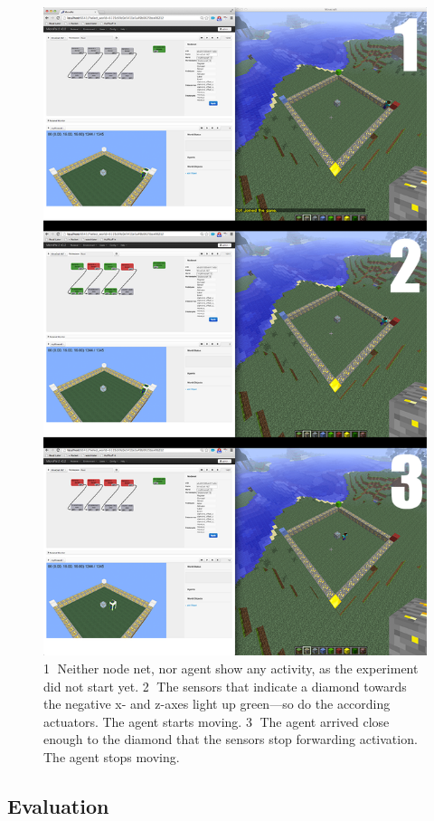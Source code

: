 \begin{figure}[h]
  \centering
    \includegraphics[width=12cm]{graphics/diamond_screens}
  \caption[Screenshots of the experiment]{\textcircled{1} Neither node net, nor agent show any activity, as the experiment did not start yet.  \textcircled{2} The sensors that indicate a diamond towards the negative x- and z-axes light up green---so do the according actuators. The agent starts moving.  \textcircled{3} The agent arrived close enough to the diamond that the sensors stop forwarding activation. The agent stops moving.}
  \label{diamond_screens}
\end{figure}

        \subsection{Evaluation}
        
